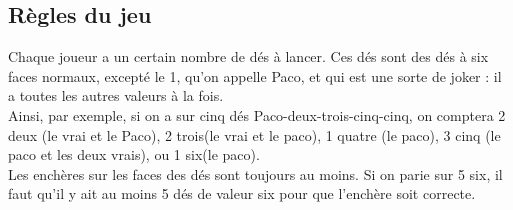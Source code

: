 \documentclass{article}
\begin{document}
\subsection{Règles du jeu}
Chaque joueur a un certain nombre de dés à lancer.  Ces dés sont des dés à six
faces normaux, excepté le 1, qu'on appelle Paco, et qui est une sorte de joker :
il a toutes les autres valeurs à la fois.
\\
Ainsi, par exemple, si on a sur
cinq dés Paco-deux-trois-cinq-cinq, on comptera 2 deux (le vrai et le Paco), 2
trois(le vrai et le paco), 1 quatre (le paco), 3 cinq (le paco et les deux
vrais), ou 1 six(le paco).
\\
Les enchères sur les faces des dés sont toujours au moins. Si on parie sur 5
six, il faut qu'il y ait au moins 5 dés de valeur six pour que l'enchère soit
correcte.
\end{document}
